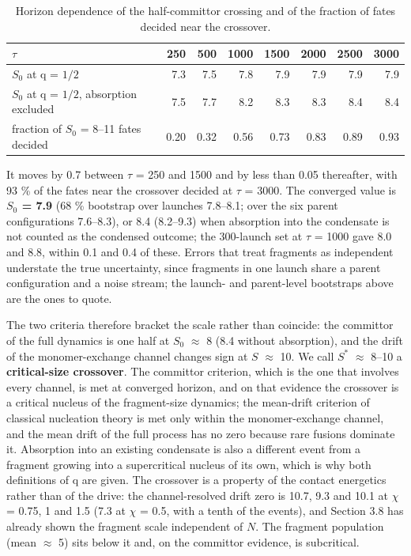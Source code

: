 \documentclass[aps,pre,preprint,superscriptaddress,nofootinbib,longbibliography]{revtex4-2}
\begin{document}
\begin{table}[htbp]
\caption{Horizon dependence of the half-committor crossing and of the fraction of fates decided near the crossover.}
\label{tab:11}
\begin{ruledtabular}
\begin{tabular}{lrrrrrrr}
$\tau$ & 250 & 500 & 1000 & 1500 & 2000 & 2500 & 3000 \\
\hline
$S_0$ at q = $1/2$ & 7.3 & 7.5 & 7.8 & 7.9 & 7.9 & 7.9 & 7.9 \\
$S_0$ at q = $1/2$, absorption excluded & 7.5 & 7.7 & 8.2 & 8.3 & 8.3 & 8.4 & 8.4 \\
fraction of $S_0$ = 8--11 fates decided & 0.20 & 0.32 & 0.56 & 0.73 & 0.83 & 0.89 & 0.93 \\
\end{tabular}
\end{ruledtabular}
\end{table}

It moves by 0.7 between $\tau$ = 250 and 1500 and by less than 0.05 thereafter, with 93 \% of the fates near the crossover decided at $\tau$ = 3000. The converged value is \textbf{$S_0$ = 7.9} (68 \% bootstrap over launches 7.8--8.1; over the six parent configurations 7.6--8.3), or 8.4 (8.2--9.3) when absorption into the condensate is not counted as the condensed outcome; the 300-launch set at $\tau$ = 1000 gave 8.0 and 8.8, within 0.1 and 0.4 of these. Errors that treat fragments as independent understate the true uncertainty, since fragments in one launch share a parent configuration and a noise stream; the launch- and parent-level bootstraps above are the ones to quote.

The two criteria therefore bracket the scale rather than coincide: the committor of the full dynamics is one half at $S_0$ $\approx$ 8 (8.4 without absorption), and the drift of the monomer-exchange channel changes sign at $S$ $\approx$ 10. We call $S^*$ $\approx$ 8--10 a \textbf{critical-size crossover}. The committor criterion, which is the one that involves every channel, is met at converged horizon, and on that evidence the crossover is a critical nucleus of the fragment-size dynamics; the mean-drift criterion of classical nucleation theory is met only within the monomer-exchange channel, and the mean drift of the full process has no zero because rare fusions dominate it. Absorption into an existing condensate is also a different event from a fragment growing into a supercritical nucleus of its own, which is why both definitions of q are given. The crossover is a property of the contact energetics rather than of the drive: the channel-resolved drift zero is 10.7, 9.3 and 10.1 at $\chi$ = 0.75, 1 and 1.5 (7.3 at $\chi$ = 0.5, with a tenth of the events), and Section 3.8 has already shown the fragment scale independent of $N$. The fragment population (mean $\approx$ 5) sits below it and, on the committor evidence, is subcritical.
\end{document}
